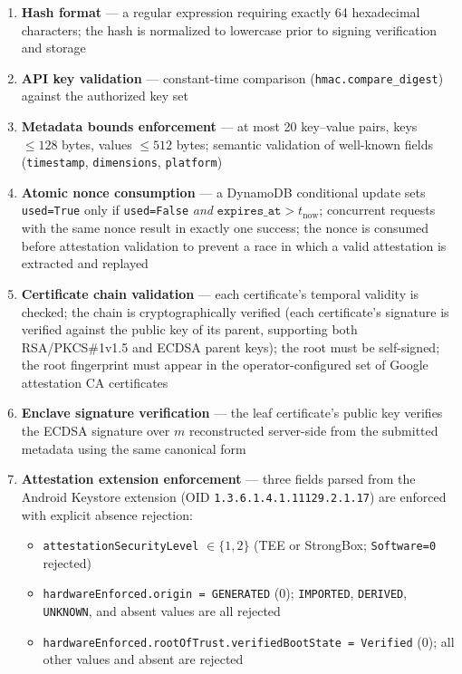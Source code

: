 \documentclass[11pt,a4paper]{article}
\begin{document}
\begin{enumerate}[label=\arabic*.]
  \item \textbf{Hash format} --- a regular expression requiring exactly 64
    hexadecimal characters; the hash is normalized to lowercase prior to signing
    verification and storage
  \item \textbf{API key validation} --- constant-time comparison
    (\texttt{hmac.compare\_digest}) against the authorized key set
  \item \textbf{Metadata bounds enforcement} --- at most 20 key--value pairs,
    keys $\leq 128$ bytes, values $\leq 512$ bytes; semantic validation of
    well-known fields (\texttt{timestamp}, \texttt{dimensions},
    \texttt{platform})
  \item \textbf{Atomic nonce consumption} --- a DynamoDB conditional update
    sets \texttt{used=True} only if \texttt{used=False} \emph{and}
    $\texttt{expires\_at} > t_{\mathrm{now}}$; concurrent requests with the
    same nonce result in exactly one success; the nonce is consumed before
    attestation validation to prevent a race in which a valid attestation is
    extracted and replayed
  \item \textbf{Certificate chain validation} --- each certificate's temporal
    validity is checked; the chain is cryptographically verified (each
    certificate's signature is verified against the public key of its parent,
    supporting both RSA/PKCS\#1v1.5 and ECDSA parent keys); the root must be
    self-signed; the root fingerprint must appear in the operator-configured set
    of Google attestation CA certificates
  \item \textbf{Enclave signature verification} --- the leaf certificate's
    public key verifies the ECDSA signature over $m$ reconstructed server-side
    from the submitted metadata using the same canonical form
  \item \textbf{Attestation extension enforcement} --- three fields parsed from
    the Android Keystore extension (OID \texttt{1.3.6.1.4.1.11129.2.1.17}) are
    enforced with explicit absence rejection:
    \begin{itemize}
      \item \texttt{attestationSecurityLevel} $\in \{1, 2\}$ (TEE or
        StrongBox; \texttt{Software=0} rejected)
      \item \texttt{hardwareEnforced.origin = GENERATED} (0);
        \texttt{IMPORTED}, \texttt{DERIVED}, \texttt{UNKNOWN}, and absent
        values are all rejected
      \item \texttt{hardwareEnforced.rootOfTrust.verifiedBootState = Verified}
        (0); all other values and absent are rejected
    \end{itemize}
\end{enumerate}
\end{document}
